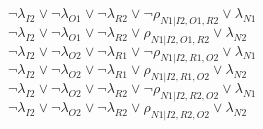 $\neg\lambda_{I2} \vee \neg\lambda_{O1} \vee \neg\lambda_{R2} \vee \neg\rho_{N1|I2,O1,R2} \vee \lambda_{N1}$\\
$\neg\lambda_{I2} \vee \neg\lambda_{O1} \vee \neg\lambda_{R2} \vee \rho_{N1|I2,O1,R2} \vee \lambda_{N2}$\\
$\neg\lambda_{I2} \vee \neg\lambda_{O2} \vee \neg\lambda_{R1} \vee \neg\rho_{N1|I2,R1,O2} \vee \lambda_{N1}$\\
$\neg\lambda_{I2} \vee \neg\lambda_{O2} \vee \neg\lambda_{R1} \vee \rho_{N1|I2,R1,O2} \vee \lambda_{N2}$\\
$\neg\lambda_{I2} \vee \neg\lambda_{O2} \vee \neg\lambda_{R2} \vee \neg\rho_{N1|I2,R2,O2} \vee \lambda_{N1}$\\
$\neg\lambda_{I2} \vee \neg\lambda_{O2} \vee \neg\lambda_{R2} \vee \rho_{N1|I2,R2,O2} \vee \lambda_{N2}$\\
